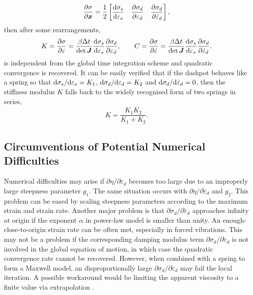 \begin{gather}\label{eq:moduli}
\dfrac{\partial\sigma}{\partial\bm{x}}=\dfrac{1}{2}\begin{bmatrix}
\dfrac{\mathrm{d}\sigma_s}{\mathrm{d}\varepsilon_s}&\dfrac{\partial\sigma_d}{\partial\varepsilon_d}&\dfrac{\partial\sigma_d}{\partial\dot\varepsilon_d}
\end{bmatrix},
\end{gather}
then after some rearrangements,
\begin{gather}\label{eq:tangent}
K=\dfrac{\partial\sigma}{\partial\varepsilon}=\dfrac{\beta\Delta{}t}{\det{\bm{J}}}\dfrac{\mathrm{d}\sigma_s}{\mathrm{d}\varepsilon_s}\dfrac{\partial\sigma_d}{\partial\varepsilon_d},\qquad{}C=\dfrac{\partial\sigma}{\partial\dot\varepsilon}=\dfrac{\beta\Delta{}t}{\det{\bm{J}}}\dfrac{\mathrm{d}\sigma_s}{\mathrm{d}\varepsilon_s}\dfrac{\partial\sigma_d}{\partial\dot\varepsilon_d}.
\end{gather}
 is independent from the global time integration scheme and quadratic convergence is recovered. It can be easily verified that if the dashpot behaves like a spring so that $\mathrm{d}\sigma_s/\mathrm{d}\varepsilon_s=K_1$, $\mathrm{d}\sigma_d/\mathrm{d}\varepsilon_d=K_2$ and $\mathrm{d}\sigma_d/\mathrm{d}\dot\varepsilon_d=0$, then the stiffness modulus $K$ falls back to the widely recognised form of two springs in series,
\begin{gather}
K=\dfrac{K_1K_2}{K_1+K_2}.
\end{gather}
\subsection{Circumventions of Potential Numerical Difficulties}
Numerical difficulties may arise if $\partial\eta/\partial\varepsilon_d$ becomes too large due to an improperly large steepness parameter $g_1$. The same situation occurs with $\partial\eta/\partial\dot\varepsilon_d$ and $g_2$. This problem can be eased by scaling steepness parameters according to the maximum strain and strain rate. Another major problem is that $\partial\sigma_d/\partial\dot\varepsilon_d$ approaches infinity at origin if the exponent $\alpha$ in power-law model is smaller than unity. An enough-close-to-origin strain rate can be often met, especially in forced vibrations. This may not be a problem if the corresponding damping modulus term $\partial\sigma_d/\partial\dot\varepsilon_d$ is not involved in the global equation of motion, in which case the quadratic convergence rate cannot be recovered. However, when combined with a spring to form a Maxwell model, an disproportionally large $\partial\sigma_d/\partial\dot\varepsilon_d$ may fail the local iteration. A possible workaround would be limiting the apparent viscosity to a finite value via extrapolation \citep[see, e.g.,][]{Wu1998}.

